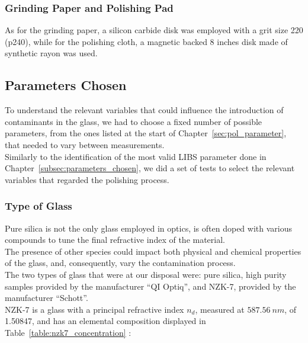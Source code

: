 \subsubsection{Grinding Paper and Polishing Pad}
\label{subsubsec:grinding_paper_and_pad}
As for the grinding paper, a silicon carbide disk was employed with a grit size 220 (p240), while for the polishing cloth, a magnetic backed 8 inches disk made of synthetic rayon was used.
\subsection{Parameters Chosen}
\label{subsec:parameters_chosen_polish}
To understand the relevant variables that could influence the introduction of contaminants in the glass, we had to choose a fixed number of possible parameters, from the ones listed at the start of Chapter~\ref{sec:pol_parameter}, that needed to vary between measurements.
\\
Similarly to the identification of the most valid LIBS parameter done in Chapter~\ref{subsec:parameters_chosen}, we did a set of tests to select the relevant variables that regarded the polishing process.

\subsubsection{Type of Glass}
Pure silica is not the only glass employed in optics,  is often doped with various compounds to tune the final refractive index of the material.
\\
The presence of other species could impact both physical and chemical properties of the glass, and, consequently, vary the contamination process.
\\
The two types of glass that were at our disposal were: pure silica, high purity samples provided by the manufacturer “QI Optiq”, and NZK-7, provided by the manufacturer “Schott”. 
\\
NZK-7 is a glass with a principal refractive index $n_d$, measured at $587.56 \: nm$, of 1.50847, and has an elemental composition displayed in Table~\ref{table:nzk7_concentration} \cite{NZK7SCHOTTAdvanced}:

